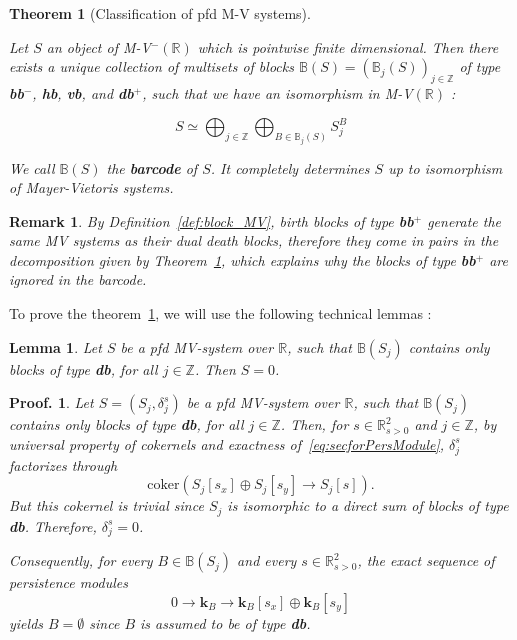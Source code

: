 \documentclass[a4paper, english, 11pt]{article}
\newcommand{\kk}[0]{\textbf{k}}
\newcommand{\0}{\vec{0}}
\newcommand{\R}[0]{\mathbb{R}}
\newcommand{\Z}[0]{\mathbb{Z}}
\newtheorem*{pf}{Proof.} }
\newtheorem{remark}[prop]{Remark}
\newtheorem{lem}[prop]{Lemma}
\newtheorem{thm}[prop]{Theorem}
\begin{document}
\begin{thm}[Classification of pfd M-V systems]\label{thm:decom_MV}

Let $S$ an object of M-V$^- (\R)$ which is pointwise finite dimensional.  Then there exists a unique collection of multisets of blocks $\mathbb{B}(S) = (\mathbb{B}_j(S))_{j\in \Z}$ of type \textbf{bb$^-$}, \textbf{hb}, \textbf{vb}, and \textbf{db}$^{+}$, such that we have an isomorphism in M-V$(\R)$ : 

$$S \simeq \bigoplus_{j\in \Z} \bigoplus_{B\in \mathbb{B}_j(S)} S_j^B $$

We call $\mathbb{B}(S)$ the \textbf{barcode} of $S$. It completely determines $S$ up to isomorphism of Mayer-Vietoris systems.
\end{thm}

\begin{remark}
By Definition~\ref{def:block_MV}, birth blocks of type \textbf{bb$^+$} generate the same MV systems as their dual death blocks, therefore  they come in pairs in the decomposition given by Theorem~\ref{thm:decom_MV}, which explains why the blocks of type \textbf{bb$^+$} are ignored in the barcode.
\end{remark}


To prove the theorem~\ref{thm:decom_MV}, we will use the following technical lemmas :

\begin{lem}
Let $S$ be a pfd MV-system over $\R$, such that $\mathbb{B}(S_j)$ contains only blocks of type \textbf{db}, for all $j\in \Z$. Then $S = 0$.

\end{lem}

\begin{pf}
Let $S = (S_j,\delta_j^s)$ be  a pfd MV-system over $\R$, such that $\mathbb{B}(S_j)$ contains only blocks of type \textbf{db}, for all $j\in \Z$. Then, for $s\in \R^2_{s>0}$ and $j\in\Z$, by universal property of cokernels and exactness of~\eqref{eq:secforPersModule}, $\delta^s_j$ factorizes through $$\text{coker}\left (S_j[s_x] \oplus S_j[s_y] \longrightarrow S_j[s] \right ).$$
But this cokernel is trivial 
since $S_j$ is isomorphic to a direct sum of blocks of type \textbf{db}. Therefore, $\delta^s_j = 0$.

Consequently, for every $B\in \mathbb{B}(S_j)$ and every $s\in \R^2_{s>0}$, the exact sequence of persistence modules 
$$0 \longrightarrow \kk_B \longrightarrow \kk_B[s_x] \oplus \kk_B[s_y] $$
yields $B = \emptyset$ since $B$ is assumed to be of type \textbf{db}.
\end{pf}
\end{document}
